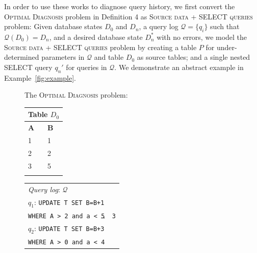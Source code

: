In order to use these works to diagnose query history, we first convert the \textsc{Optimal Diagnosis} problem in Definition 4 as \textsc{Source data + SELECT queries} problem:
Given database states $D_0$ and $D_n$, a query log $\mathcal{Q} = \{q_i\}$ such that $\mathcal{Q}(D_0) = D_n$, and a desired database state $D_n^*$ with no errors, we model the \textsc{Source data + SELECT queries} problem by creating a table $P$ for under-determined parameters in $\mathcal{Q}$ and table $D_0$ as source tables; and a single nested SELECT query $q_n'$ for queries in $\mathcal{Q}$. We demonstrate an abstract example in Example~\ref{fig:example}.
\begin{figure}[t]
The \textsc{Optimal Diagnosis} problem:\\
    \begin{minipage}[t]{0.1\textwidth}
         \vspace{0pt} 
         \centering
        \begin{tabular}{ll}
            \multicolumn{2}{l}{Table $D_0$}\\
            \toprule
            \textbf{A}  & \textbf{B}\\
            \midrule
			 1 & 1 \\
			 2 & 2 \\
			 3 & 5 \\
            \bottomrule
            \\
        \end{tabular}
    \end{minipage}
    \begin{minipage}[t]{0.2\textwidth}
         \vspace{0pt} 
         \centering
        \begin{tabular}{p{26ex}}
            \multicolumn{1}{l}{\emph{Query log}: $\mathcal{Q}$}\\
            $q_1$: \texttt{\small UPDATE T SET B=B+1}\\
            \texttt{\small WHERE A > 2 and a < \sout{5} {\color{red} 3}} \\
            $q_2$: \texttt{\small UPDATE T SET B=B+3}\\
                  \texttt{\small WHERE A > 0 and a < 4} \\
        \end{tabular}
    \end{minipage}
    \begin{minipage}[t]{0.16\textwidth}
         \vspace{0pt} 
         \centering

\end{minipage}
\end{figure}
